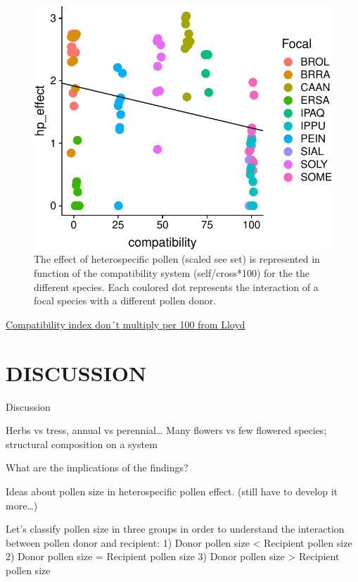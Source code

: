 \documentclass[11pt,a4paper]{article}
\begin{document}
\begin{figure}
\centering
\includegraphics{output/figures/unnamed-chunk-3-1.pdf}
\caption{The effect of heterospecific pollen (scaled see set) is
represented in function of the compatibility system (self/cross*100) for
the the different species. Each coulored dot represents the interaction
of a focal species with a different pollen donor.}
\end{figure}

\href{Jose}{Compatibility index don´t multiply per 100 from Lloyd}

\newpage

\section{DISCUSSION}\label{discussion}

Discussion

Herbs vs tress, annual vs perennial\ldots{} Many flowers vs few flowered
species; structural composition on a system

What are the implications of the findings?

Ideas about pollen size in heterospecific pollen effect. (still have to
develop it more\ldots{})

Let's classify pollen size in three groups in order to understand the
interaction between pollen donor and recipient: 1) Donor pollen size
\textless{} Recipient pollen size 2) Donor pollen size = Recipient
pollen size 3) Donor pollen size \textgreater{} Recipient pollen size
\end{document}
